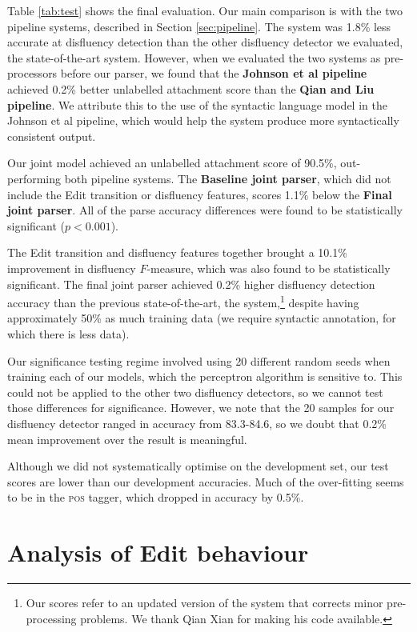 \documentclass[11pt,letterpaper]{article}
\begin{document}
Table \ref{tab:test} shows the final evaluation.
Our main comparison is with the two pipeline systems, described in Section
\ref{sec:pipeline}.  The \citet{Johnson04a} system was 1.8\% less
accurate at disfluency detection than the other disfluency detector we evaluated,
the state-of-the-art \citet{qian:13} system.  However, when we evaluated the two
systems as pre-processors before our parser, we found that the
\textbf{Johnson et al pipeline} achieved 0.2\% better unlabelled attachment score
than the \textbf{Qian and Liu pipeline}.  We attribute this to the use of the
\citet{Charniak01a} syntactic language model in the Johnson et al pipeline, which
would help the system produce more syntactically consistent output.

Our joint model achieved an unlabelled attachment score of 90.5\%, out-performing
both pipeline systems.  The \textbf{Baseline joint parser}, which did not include
the Edit transition or disfluency features, scores 1.1\% below the
\textbf{Final joint parser}.  All of the parse accuracy differences were found to
be statistically significant ($p<0.001$).

The Edit transition and disfluency features together brought a 10.1\% improvement
in disfluency $F$-measure, which was also found to be statistically significant.
The final joint parser achieved 0.2\% higher disfluency detection accuracy than
the previous state-of-the-art, the \citet{qian:13} system,\footnote{
Our scores refer to an updated version of the system
that corrects minor pre-processing problems. We thank Qian Xian for making
his code available.} despite having approximately 50\%
as much training data (we require syntactic annotation, for which there is
less data).

Our significance testing regime involved using 20 different random seeds when
training each of our models, which the perceptron algorithm is sensitive to.
This could not be applied to the other two disfluency detectors, so we cannot
test those differences for significance.  However, we note that the 20 samples
for our disfluency detector ranged in accuracy from 83.3-84.6, so we doubt
that 0.2\% mean improvement over the \citet{qian:13} result is meaningful.

Although we did not systematically
optimise on the development set, our test scores are lower than our development
accuracies. Much of the over-fitting seems to be in the \textsc{pos} tagger,
which dropped in accuracy by 0.5\%.

\section{Analysis of Edit behaviour}
\end{document}
